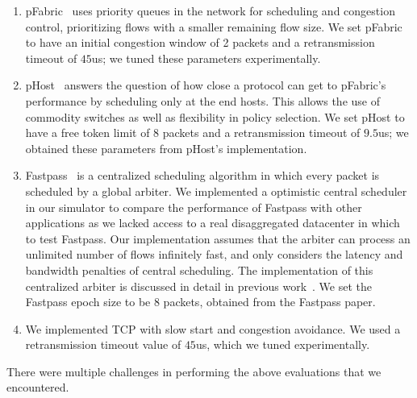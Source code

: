 \begin{enumerate}
\item {} pFabric~\cite{pfabric} uses priority queues in the network for scheduling and congestion control, prioritizing flows with a smaller remaining flow size. We set pFabric to have an initial congestion window of 2 packets and a retransmission timeout of $45$us; we tuned these parameters experimentally.
%
\item {} pHost~\cite{phost} answers the question of how close a protocol can get to pFabric's performance by scheduling only at the end hosts. This allows the use of commodity switches as well as flexibility in policy selection. We set pHost to have a free token limit of 8 packets and a retransmission timeout of $9.5$us; we obtained these parameters from pHost's implementation.
%
\item {} Fastpass~\cite{fastpass} is a centralized scheduling algorithm in which every packet is scheduled by a global arbiter. We implemented a optimistic central scheduler in our simulator to compare the performance of Fastpass with other applications as we lacked access to a real disaggregated datacenter in which to test Fastpass. Our implementation assumes that the arbiter can process an unlimited number of flows infinitely fast, and only considers the latency and bandwidth penalties of central scheduling. The implementation of this centralized arbiter is discussed in detail in previous work~\cite{phost}. We set the Fastpass epoch size to be 8 packets, obtained from the Fastpass paper.
%
\item {} We implemented TCP with slow start and congestion avoidance. We used a retransmission timeout value of $45$us, which we tuned experimentally.
\end{enumerate}

There were multiple challenges in performing the above evaluations that we encountered.


